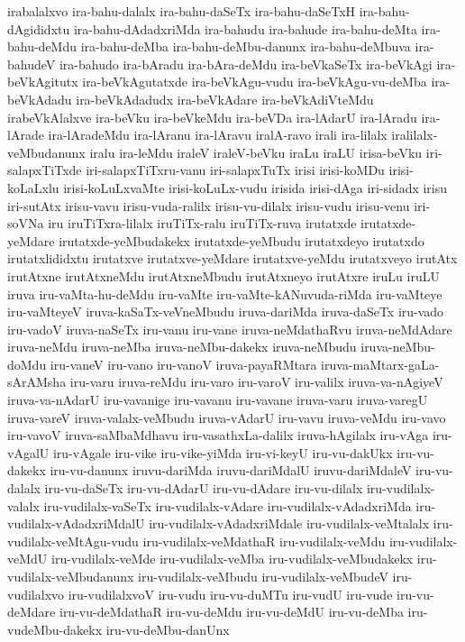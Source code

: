 {irabalalxvo
ira-bahu-dalalx
ira-bahu-daSeTx
ira-bahu-daSeTxH
ira-bahu-dAgididxtu
ira-bahu-dAdadxriMda
ira-bahudu
ira-bahude
ira-bahu-deMta
ira-bahu-deMdu
ira-bahu-deMba
ira-bahu-deMbu-danunx
ira-bahu-deMbuva
ira-bahudeV
ira-bahudo
ira-bAradu
ira-bAra-deMdu
ira-beVkaSeTx
ira-beVkAgi
ira-beVkAgitutx
ira-beVkAgutatxde
ira-beVkAgu-vudu
ira-beVkAgu-vu-deMba
ira-beVkAdadu
ira-beVkAdadudx
ira-beVkAdare
ira-beVkAdiVteMdu
irabeVkAlalxve
ira-beVku
ira-beVkeMdu
ira-beVDa
ira-lAdarU
ira-lAradu
ira-lArade
ira-lAradeMdu
ira-lAranu
ira-lAravu
iralA-ravo
irali
ira-lilalx
iralilalx-veMbudanunx
iralu
ira-leMdu
iraleV
iraleV-beVku
iraLu
iraLU
irisa-beVku
iri-salapxTiTxde
iri-salapxTiTxru-vanu
iri-salapxTuTx
irisi
irisi-koMDu
irisi-koLaLxlu
irisi-koLuLxvaMte
irisi-koLuLx-vudu
irisida
irisi-dAga
iri-sidadx
irisu
iri-sutAtx
irisu-vavu
irisu-vuda-ralilx
irisu-vu-dilalx
irisu-vudu
irisu-venu
iri-soVNa
iru
iruTiTxra-lilalx
iruTiTx-ralu
iruTiTx-ruva
irutatxde
irutatxde-yeMdare
irutatxde-yeMbudakekx
irutatxde-yeMbudu
irutatxdeyo
irutatxdo
irutatxlididxtu
irutatxve
irutatxve-yeMdare
irutatxve-yeMdu
irutatxveyo
irutAtx
irutAtxne
irutAtxneMdu
irutAtxneMbudu
irutAtxneyo
irutAtxre
iruLu
iruLU
iruva
iru-vaMta-hu-deMdu
iru-vaMte
iru-vaMte-kANuvuda-riMda
iru-vaMteye
iru-vaMteyeV
iruva-kaSaTx-veVneMbudu
iruva-dariMda
iruva-daSeTx
iru-vado
iru-vadoV
iruva-naSeTx
iru-vanu
iru-vane
iruva-neMdathaRvu
iruva-neMdAdare
iruva-neMdu
iruva-neMba
iruva-neMbu-dakekx
iruva-neMbudu
iruva-neMbu-doMdu
iru-vaneV
iru-vano
iru-vanoV
iruva-payaRMtara
iruva-maMtarx-gaLa-sArAMsha
iru-varu
iruva-reMdu
iru-varo
iru-varoV
iru-valilx
iruva-va-nAgiyeV
iruva-va-nAdarU
iru-vavanige
iru-vavanu
iru-vavane
iruva-varu
iruva-varegU
iruva-vareV
iruva-valalx-veMbudu
iruva-vAdarU
iru-vavu
iruva-veMdu
iru-vavo
iru-vavoV
iruva-saMbaMdhavu
iru-vasathxLa-dalilx
iruva-hAgilalx
iru-vAga
iru-vAgalU
iru-vAgale
iru-vike
iru-vike-yiMda
iru-vi-keyU
iru-vu-dakUkx
iru-vu-dakekx
iru-vu-danunx
iruvu-dariMda
iruvu-dariMdalU
iruvu-dariMdaleV
iru-vu-dalalx
iru-vu-daSeTx
iru-vu-dAdarU
iru-vu-dAdare
iru-vu-dilalx
iru-vudilalx-valalx
iru-vudilalx-vaSeTx
iru-vudilalx-vAdare
iru-vudilalx-vAdadxriMda
iru-vudilalx-vAdadxriMdalU
iru-vudilalx-vAdadxriMdale
iru-vudilalx-veMtalalx
iru-vudilalx-veMtAgu-vudu
iru-vudilalx-veMdathaR
iru-vudilalx-veMdu
iru-vudilalx-veMdU
iru-vudilalx-veMde
iru-vudilalx-veMba
iru-vudilalx-veMbudakekx
iru-vudilalx-veMbudanunx
iru-vudilalx-veMbudu
iru-vudilalx-veMbudeV
iru-vudilalxvo
iru-vudilalxvoV
iru-vudu
iru-vu-duMTu
iru-vudU
iru-vude
iru-vu-deMdare
iru-vu-deMdathaR
iru-vu-deMdu
iru-vu-deMdU
iru-vu-deMba
iru-vudeMbu-dakekx
iru-vu-deMbu-danUnx
}
